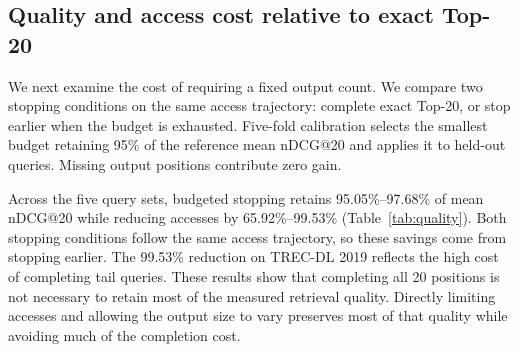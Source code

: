 

\subsection{Quality and access cost relative to exact Top-20}

\label{quality-and-access-cost-relative-to-exact-top-20}

We next examine the cost of requiring a fixed output count. We compare two stopping conditions on the same access trajectory: complete exact Top-20, or stop earlier when the budget is exhausted. Five-fold calibration selects the smallest budget retaining 95\% of the reference mean nDCG@20 and applies it to held-out queries. Missing output positions contribute zero gain.



Across the five query sets, budgeted stopping retains 95.05\%--97.68\% of mean nDCG@20 while reducing accesses by 65.92\%--99.53\% (Table~\ref{tab:quality}). Both stopping conditions follow the same access trajectory, so these savings come from stopping earlier. The 99.53\% reduction on TREC-DL 2019 reflects the high cost of completing tail queries. These results show that completing all 20 positions is not necessary to retain most of the measured retrieval quality. Directly limiting accesses and allowing the output size to vary preserves most of that quality while avoiding much of the completion cost.
